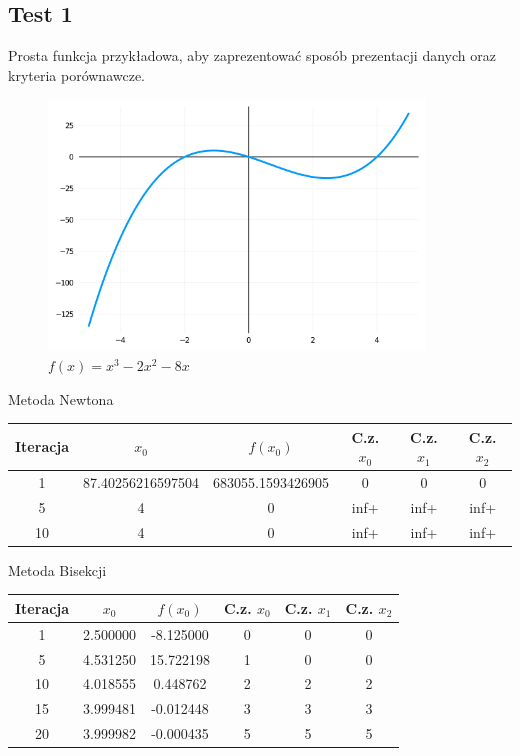 \documentclass[a4paper]{article}
\begin{document}
\subsection{Test 1}
    Prosta funkcja przykładowa, aby zaprezentować sposób prezentacji danych oraz kryteria porównawcze.
    \begin{figure}[h]
        \centering
        \includegraphics[width=10cm]{1}
        \caption{$f(x) = x^3 - 2x^2 - 8x$}
    \end{figure}
    
    \begin{center}
        Metoda Newtona
    \end{center}
    \begin{center}
        \begin{tabular}{|c|c|c|c|c|c|} 
            \hline
            Iteracja & $x_0$ & $f(x_0)$ & C.z. $x_0$ & C.z. $x_1$ & C.z. $x_2$ \\
            \hline
            1 & 87.40256216597504 & 683055.1593426905 & 0 & 0 & 0 \\
            \hline
            5 & 4 & 0 & inf+ & inf+ & inf+ \\
            \hline
            10 & 4 & 0 & inf+ & inf+ & inf+ \\
            \hline
        \end{tabular}
    \end{center}
        
    \vspace{5mm}

    \begin{center}
        Metoda Bisekcji
    \end{center}
    \begin{center}
        \begin{tabular}{|c|c|c|c|c|c|} 
            \hline
            Iteracja & $x_0$ & $f(x_0)$ & C.z. $x_0$ & C.z. $x_1$ & C.z. $x_2$ \\
            \hline
            1 & 2.500000 & -8.125000 & 0 & 0 & 0 \\
            \hline
            5 & 4.531250 & 15.722198 & 1 & 0 & 0 \\
            \hline
            10 & 4.018555 & 0.448762 & 2 & 2 & 2 \\
            \hline
            15 & 3.999481 & -0.012448 & 3 & 3 & 3 \\
            \hline
            20 & 3.999982 & -0.000435 & 5 & 5 & 5 \\
            \hline
        \end{tabular}
    \end{center}
    
\end{document}
